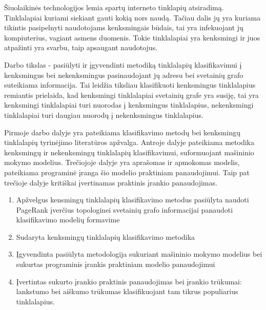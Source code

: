 \documentclass[12pt, a4paper, onecolumn, titlepage, oneside, intlimits]{report}
\begin{document}
\ktuinit{}

\newpage


Šiuolaikinės technologijos lemia spartų interneto tinklapių atsiradimą. Tinklalapiai kuriami siekiant gauti kokią nors naudą. Tačiau dalis jų yra kuriama tikintis pasipelnyti naudotojams kenksmingais būdais, tai yra infekuojant jų kompiuterius, vagiant asmens duomenis. Tokie tinklalapiai yra kenksmingi ir juos atpažinti yra svarbu, taip apsaugant naudotojus.

Darbo tikslas - pasiūlyti ir įgyvendinti metodiką tinklalapių klasifikavimui į kenksmingus bei nekenksmingus pasinaudojant jų adresu bei svetainių grafo suteikiama informacija. Tai leidžia tiksliau klasifikuoti kenksmingus tinklalapius remiantis prielaida, kad kenksmingi tinklalapiai svetainių grafe yra susiję, tai yra kenksmingi tinklalapiai turi nuorodas į kenksmingus tinklalapius, nekenksmingi tinklalapiai turi daugiau nuorodų į nekenksmingus tinklalapius.

Pirmoje darbo dalyje yra pateikiama klasifikavimo metodų bei kenksmingų tinklalapių tyrinėjimo literatūros apžvalga. Antroje dalyje pateikiama metodika kenksmingų ir nekenksmingų tinklalapių klasifikavimui, suformuojant mašininio mokymo modelius. Trečiojoje dalyje yra aprašomas ir apmokomas modelis, pateikiama programinė įranga šio modelio praktiniam panaudojimui. Taip pat trečioje dalyje kritiškai įvertinamas praktinis įrankio panaudojimas.

\newpage










\newpage




\newpage








\begin{enumerate}[label=\arabic*.]
\item Apžvelgus kensmingų tinklalapių klasifikavimo metodus pasiūlyta naudoti PageRank įverčius topologinei svetainių grafo informacijai panaudoti klasifikavimo modelių formavime
\item Sudaryta kenksmingų tinklalapių klasifikavimo metodika
\item Įgyvendinta pasiūlyta metodologija sukuriant mašininio mokymo modelius bei sukurtas programinis įrankis praktiniam modelio panaudojimui
\item Įvertintas sukurto įrankio praktinis panaudojimas bei įrankio trūkumai: lankstumo bei aiškumo trūkumas klasifikuojant tam tikrus populiarius tinklalapius.
\end{enumerate}
\end{document}
